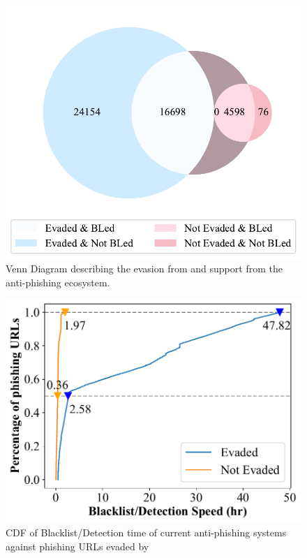 \begin{figure}
\centering
\includegraphics[width=\linewidth]{figs/venn_eval_3.pdf}
\caption{Venn Diagram describing the evasion from \spartacus and support from the anti-phishing ecosystem.}
\label{fig:venn_support}
\end{figure}

\begin{figure}
\centering
\includegraphics[width=\linewidth]{figs/evade_bl_time_total.pdf}
\caption{CDF of Blacklist/Detection time of current anti-phishing systems against phishing URLs evaded by \spartacus}
\label{fig:evade_bl_time}
\end{figure}


